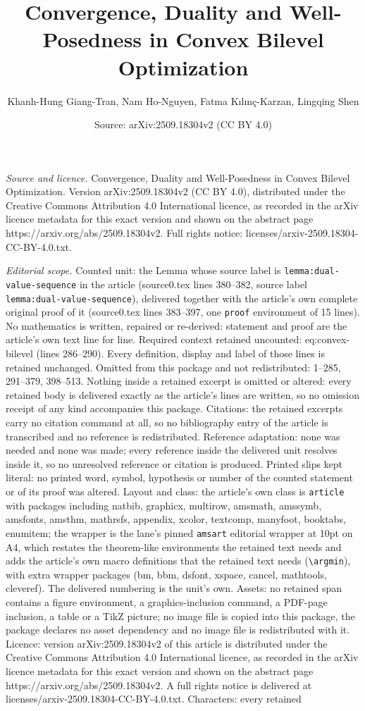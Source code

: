 \documentclass[10pt,a4paper]{amsart}
\title[Convergence, Duality and Well-Posedness in Convex Bilevel Op]{Convergence, Duality and Well-Posedness in Convex Bilevel Optimization}
\author{Khanh-Hung Giang-Tran, Nam Ho-Nguyen, Fatma K{\i}l{\i}n\c{c}-Karzan, Lingqing Shen}
\date{Source: arXiv:2509.18304v2 (CC BY 4.0)}
\begin{document}
\maketitle

\noindent\emph{Source and licence.} Convergence, Duality and Well-Posedness in Convex Bilevel Optimization. Version arXiv:2509.18304v2 (CC BY 4.0), distributed under the Creative Commons Attribution 4.0 International licence, as recorded in the arXiv licence metadata for this exact version and shown on the abstract page https://arxiv.org/abs/2509.18304v2. Full rights notice: licenses/arxiv-2509.18304-CC-BY-4.0.txt.\par\smallskip

\noindent\textit{Editorial scope.} Counted unit: the Lemma whose source label is \texttt{lemma:dual-value-sequence} in the article (source0.tex lines 380--382, source label \texttt{lemma:dual-value-sequence}), delivered together with the article's own complete original proof of it (source0.tex lines 383--397, one \texttt{proof} environment of 15 lines). No mathematics is written, repaired or re-derived: statement and proof are the article's own text line for line. Required context retained uncounted: eq:convex-bilevel (lines 286--290). Every definition, display and label of those lines is retained unchanged. Omitted from this package and not redistributed: 1--285, 291--379, 398--513. Nothing inside a retained excerpt is omitted or altered: every retained body is delivered exactly as the article's lines are written, so no omission receipt of any kind accompanies this package. Citations: the retained excerpts carry no citation command at all, so no bibliography entry of the article is transcribed and no reference is redistributed. Reference adaptation: none was needed and none was made; every reference inside the delivered unit resolves inside it, so no unresolved reference or citation is produced. Printed slips kept literal: no printed word, symbol, hypothesis or number of the counted statement or of its proof was altered. Layout and class: the article's own class is \texttt{article} with packages including natbib, graphicx, multirow, amsmath, amssymb, amsfonts, amsthm, mathrsfs, appendix, xcolor, textcomp, manyfoot, booktabs, enumitem; the wrapper is the lane's pinned \texttt{amsart} editorial wrapper at 10pt on A4, which restates the theorem-like environments the retained text needs and adds the article's own macro definitions that the retained text needs (\texttt{\textbackslash argmin}), with extra wrapper packages (bm, bbm, dsfont, xspace, cancel, mathtools, cleveref). The delivered numbering is the unit's own. Assets: no retained span contains a figure environment, a graphics-inclusion command, a PDF-page inclusion, a table or a TikZ picture; no image file is copied into this package, the package declares no asset dependency and no image file is redistributed with it. Licence: version arXiv:2509.18304v2 of this article is distributed under the Creative Commons Attribution 4.0 International licence, as recorded in the arXiv licence metadata for this exact version and shown on the abstract page https://arxiv.org/abs/2509.18304v2. A full rights notice is delivered at licenses/arxiv-2509.18304-CC-BY-4.0.txt. Characters: every retained 
\end{document}
